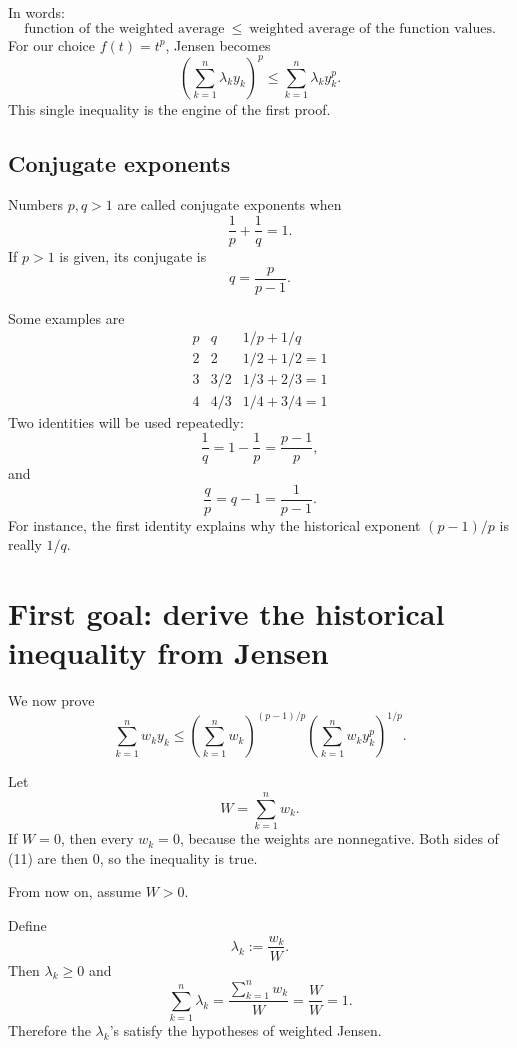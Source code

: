 \documentclass[11pt]{article}
\begin{document}
In words:
\[
 \boxed{\text{function of the weighted average}
 \ \leq\ \text{weighted average of the function values}.}
\]
For our choice \(f(t)=t^p\), Jensen becomes
\[
 \left(\sum_{k=1}^{n}\lambda_ky_k\right)^p
 \leq
 \sum_{k=1}^{n}\lambda_ky_k^p.
 \tag{6}
\]
This single inequality is the engine of the first proof.

\subsection{Conjugate exponents}

\begin{definitionBox}
Numbers \(p,q>1\) are called conjugate exponents when
\[
 \frac1p+\frac1q=1.
 \tag{7}
\]
If \(p>1\) is given, its conjugate is
\[
 q=\frac{p}{p-1}.
 \tag{8}
\]
\end{definitionBox}

Some examples are
\[
\begin{array}{c|c|c}
 p & q & 1/p+1/q\\ \hline
 2 & 2 & 1/2+1/2=1\\[2pt]
 3 & 3/2 & 1/3+2/3=1\\[2pt]
 4 & 4/3 & 1/4+3/4=1
\end{array}
\]
Two identities will be used repeatedly:
\[
 \frac1q=1-\frac1p=\frac{p-1}{p},
 \tag{9}
\]
and
\[
 \frac{q}{p}=q-1=\frac1{p-1}.
 \tag{10}
\]
For instance, the first identity explains why the historical exponent \((p-1)/p\) is really \(1/q\).

\section{First goal: derive the historical inequality from Jensen}

We now prove
\[
 \sum_{k=1}^{n}w_ky_k
 \leq
 \left(\sum_{k=1}^{n}w_k\right)^{(p-1)/p}
 \left(\sum_{k=1}^{n}w_ky_k^p\right)^{1/p}.
 \tag{11}
\]

\begin{solutionBox}
Let
\[
 W=\sum_{k=1}^{n}w_k.
\]
If \(W=0\), then every \(w_k=0\), because the weights are nonnegative. Both sides of (11) are then \(0\), so the inequality is true.

From now on, assume \(W>0\).
\end{solutionBox}

\begin{solutionBox}
Define
\[
 \lambda_k:=\frac{w_k}{W}.
 \tag{12}
\]
Then \(\lambda_k\geq0\) and
\[
 \sum_{k=1}^{n}\lambda_k
 =\frac{\sum_{k=1}^{n}w_k}{W}
 =\frac{W}{W}=1.
 \tag{13}
\]
Therefore the \(\lambda_k\)'s satisfy the hypotheses of weighted Jensen.
\end{solutionBox}
\end{document}
